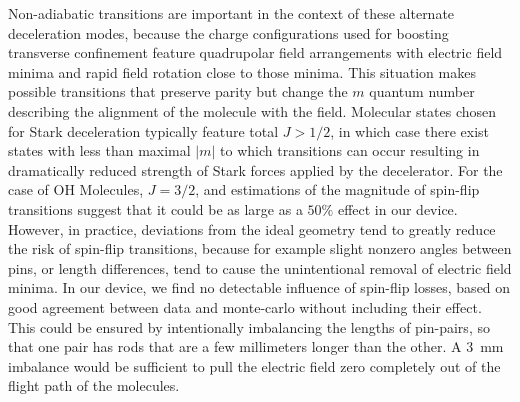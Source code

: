 \documentclass[%
 reprint,
 amsmath,amssymb,
 aps,
prl,
]{revtex4-1}
\begin{document}

Non-adiabatic transitions are important in the context of these alternate deceleration modes, because the charge configurations used for boosting transverse confinement feature quadrupolar field arrangements with electric field minima and rapid field rotation close to those minima.
This situation makes possible transitions that preserve parity but change the $m$ quantum number describing the alignment of the molecule with the field.
Molecular states chosen for Stark deceleration typically feature total $J>1/2$, in which case there exist states with less than maximal $|m|$ to which transitions can occur resulting in dramatically reduced strength of Stark forces applied by the decelerator.
For the case of OH Molecules, $J=3/2$, and estimations of the magnitude of spin-flip transitions suggest that it could be as large as a $50\%$ effect in our device. 
However, in practice, deviations from the ideal geometry tend to greatly reduce the risk of spin-flip transitions, because for example slight nonzero angles between pins, or length differences, tend to cause the unintentional removal of electric field minima.
In our device, we find no detectable influence of spin-flip losses, based on good agreement between data and monte-carlo without including their effect.
This could be ensured by intentionally imbalancing the lengths of pin-pairs, so that one pair has rods that are a few millimeters longer than the other. A $3$~mm imbalance would be sufficient to pull the electric field zero completely out of the flight path of the molecules. 
\end{document}
